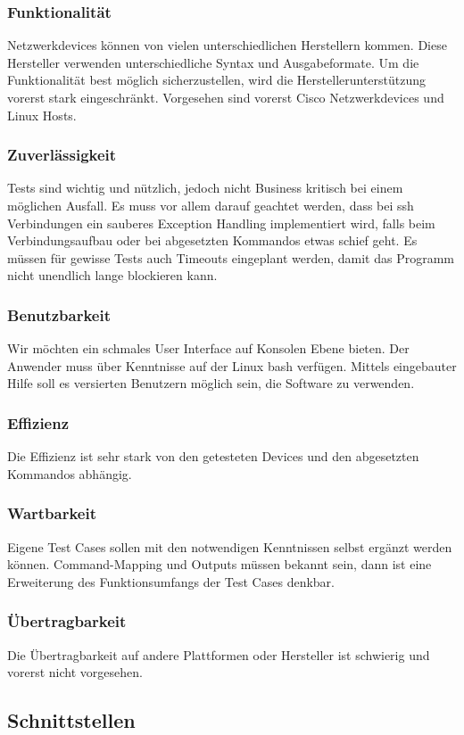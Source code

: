 \documentclass[a4,12pt]{scrartcl}
\begin{document}
\subsubsection{Funktionalität}
Netzwerkdevices können von vielen unterschiedlichen Herstellern kommen. Diese Hersteller verwenden unterschiedliche Syntax und Ausgabeformate. Um die Funktionalität best möglich sicherzustellen, wird die Herstellerunterstützung vorerst stark eingeschränkt. Vorgesehen sind vorerst Cisco Netzwerkdevices und Linux Hosts.
\subsubsection{Zuverlässigkeit}
Tests sind wichtig und nützlich, jedoch nicht Business kritisch bei einem möglichen Ausfall. Es muss vor allem darauf geachtet werden, dass bei ssh Verbindungen ein sauberes Exception Handling implementiert wird, falls beim Verbindungsaufbau oder bei abgesetzten Kommandos etwas schief geht. Es müssen für gewisse Tests auch Timeouts eingeplant werden, damit das Programm nicht unendlich lange blockieren kann.
\subsubsection{Benutzbarkeit}
Wir möchten ein schmales User Interface auf Konsolen Ebene bieten. Der Anwender muss über Kenntnisse auf der Linux bash verfügen. Mittels eingebauter Hilfe soll es versierten Benutzern möglich sein, die Software zu verwenden.
\subsubsection{Effizienz}
Die Effizienz ist sehr stark von den getesteten Devices und den abgesetzten Kommandos abhängig. 
\subsubsection{Wartbarkeit}
Eigene Test Cases sollen mit den notwendigen Kenntnissen selbst ergänzt werden können. Command-Mapping und Outputs müssen bekannt sein, dann ist eine Erweiterung des Funktionsumfangs der Test Cases denkbar.
\subsubsection{Übertragbarkeit}
Die Übertragbarkeit auf andere Plattformen oder Hersteller ist schwierig und vorerst nicht vorgesehen.

\subsection{Schnittstellen}
\end{document}
